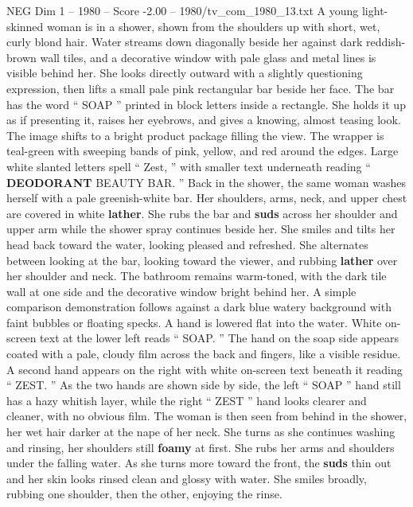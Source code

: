 \begin{textsample}{NEG Dim 1 – 1980 – Score -2.00 – 1980/tv\_com\_1980\_13.txt}  \label{ex:f1_neg_047}
A young light-skinned woman is in a shower, shown from the shoulders up with short, wet, curly blond hair.
Water streams down diagonally beside her against dark reddish-brown wall tiles, and a decorative window with pale glass and metal lines is visible behind her.
She looks directly outward with a slightly questioning expression, then lifts a small pale pink rectangular bar beside her face.
The bar has the word “ SOAP ” printed in block letters inside a rectangle.
She holds it up as if presenting it, raises her eyebrows, and gives a knowing, almost teasing look.
The image shifts to a bright product package filling the view.
The wrapper is teal-green with sweeping bands of pink, yellow, and red around the edges.
Large white slanted letters spell “ Zest, ” with smaller text underneath reading “ \textbf{DEODORANT} BEAUTY BAR. ” Back in the shower, the same woman washes herself with a pale greenish-white bar.
Her shoulders, arms, neck, and upper chest are covered in white \textbf{lather}.
She rubs the bar and \textbf{suds} across her shoulder and upper arm while the shower spray continues beside her.
She smiles and tilts her head back toward the water, looking pleased and refreshed.
She alternates between looking at the bar, looking toward the viewer, and rubbing \textbf{lather} over her shoulder and neck.
The bathroom remains warm-toned, with the dark tile wall at one side and the decorative window bright behind her.
A simple comparison demonstration follows against a dark blue watery background with faint bubbles or floating specks.
A hand is lowered flat into the water.
White on-screen text at the lower left reads “ SOAP. ” The hand on the soap side appears coated with a pale, cloudy film across the back and fingers, like a visible residue.
A second hand appears on the right with white on-screen text beneath it reading “ ZEST. ” As the two hands are shown side by side, the left “ SOAP ” hand still has a hazy whitish layer, while the right “ ZEST ” hand looks clearer and cleaner, with no obvious film.
The woman is then seen from behind in the shower, her wet hair darker at the nape of her neck.
She turns as she continues washing and rinsing, her shoulders still \textbf{foamy} at first.
She rubs her arms and shoulders under the falling water.
As she turns more toward the front, the \textbf{suds} thin out and her skin looks rinsed clean and glossy with water.
She smiles broadly, rubbing one shoulder, then the other, enjoying the rinse.

\end{textsample}
